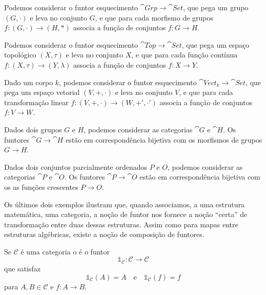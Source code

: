 \begin{exemplo}
    Podemos considerar o funtor esquecimento $\cat{Grp} \to \cat{Set}$, que pega um grupo $(G, \cdot)$ e leva no conjunto $G$, e que para cada morfismo de grupos $f \colon (G, \cdot) \to (H, *)$ associa a função de conjuntos $f \colon G \to H$.
\end{exemplo}

\begin{exemplo}
    Podemos considerar o funtor esquecimento $\cat{Top} \to \cat{Set}$, que pega um espaço topológico $(X, \tau)$ e leva no conjunto $X$, e que para cada função contínua $f \colon (X, \tau) \to (Y, \lambda)$ associa a função de conjuntos $f \colon X \to Y$.
\end{exemplo}

\begin{exemplo}
    Dado um corpo $k$, podemos considerar o funtor esquecimento $\cat{Vect}_k \to \cat{Set}$, que pega um espaço vetorial $(V, +, \cdot)$ e leva no conjunto $V$, e que para cada transformação linear $f \colon (V, +, \cdot) \to (W, +', \cdot')$ associa a função de conjuntos $f \colon V \to W$.
\end{exemplo}

\begin{exemplo}
    Dados dois grupos $G$ e $H$, podemos considerar as categorias $\cat{G}$ e $\cat{H}$. Os funtores $\cat{G} \to \cat{H}$ estão em correspondência bijetiva com os morfismos de grupos $G \to H$.
\end{exemplo}

\begin{exemplo}
    Dados dois conjuntos parcialmente ordenados $P$ e $O$, podemos considerar as categorias $\cat{P}$ e $\cat{O}$. Os funtores $\cat{P} \to \cat{O}$ estão em correspondência bijetiva com os as funções crescentes $P \to O$.
\end{exemplo}

Os últimos dois exemplos ilustram que, quando associamos, a uma estrutura matemática, uma categoria, a noção de funtor nos fornece a noção ``certa'' de transformação entre duas dessas estruturas. Assim como para mapas entre estruturas algébricas, existe a noção de composição de funtores.

\begin{definicao}
    Se $\mathcal{C}$ é uma categoria o  é o funtor \begin{equation}
        \mathbb{1}_{\mathcal{C}} \colon \mathcal{C} \to \mathcal{C}
    \end{equation} que satisfaz \begin{equation}
        \mathbb{1}_\mathcal{C}(A) = A \quad \text{e} \quad \mathbb{1}_\mathcal{C}(f) = f
    \end{equation} para $A, B \in \mathcal{C}$ e $f \colon A \to B$.
\end{definicao}

